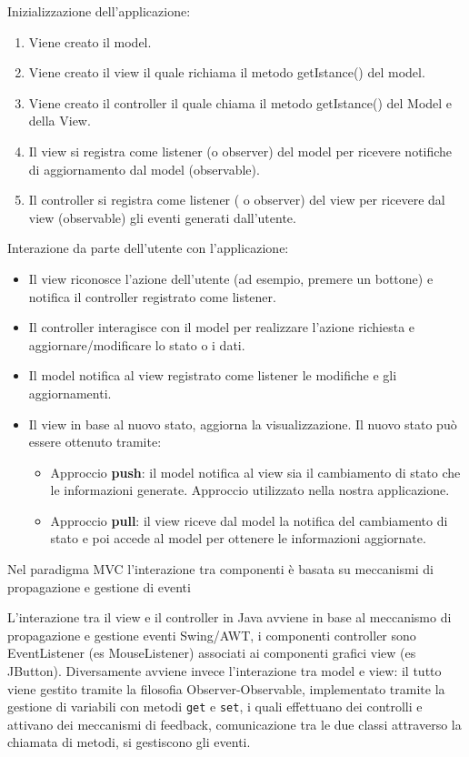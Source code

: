 			Inizializzazione dell'applicazione: 
			\begin{enumerate}
				\item Viene creato il model.
				\item Viene creato il view il quale richiama il metodo getIstance() del model.
				\item Viene creato il controller il quale chiama il metodo getIstance() del Model e della View. 
				\item Il view si registra come listener (o observer) del model per ricevere notifiche di aggiornamento dal model (observable).
				\item Il controller si registra come listener ( o observer) del view per ricevere dal view (observable) gli eventi generati dall'utente.
			\end{enumerate}
			Interazione da parte dell'utente con l'applicazione: 
			\begin{itemize}
				\item Il view riconosce l'azione dell'utente (ad esempio, premere un bottone) e notifica il controller registrato come listener.
				\item Il controller interagisce con il model per realizzare l'azione richiesta e aggiornare/modificare lo stato o i dati.
				\item Il model notifica al view registrato come listener le modifiche e gli aggiornamenti.
				\item Il view in base al nuovo stato, aggiorna la visualizzazione. Il nuovo stato può essere ottenuto tramite:
				\begin{itemize}
					\item Approccio \textbf{push}: il model notifica al view sia il cambiamento di stato che le informazioni generate. Approccio utilizzato nella nostra applicazione.
					\item Approccio \textbf{pull}: il view riceve dal model la notifica del cambiamento di stato e poi accede al model per ottenere le informazioni aggiornate.
				\end{itemize}
			\end{itemize}
			
			Nel paradigma MVC l'interazione tra componenti è basata su meccanismi di propagazione e gestione di eventi 
			
			L'interazione tra il view e il controller in Java avviene in base al meccanismo di propagazione e gestione eventi Swing/AWT, i componenti controller sono EventListener (es MouseListener) associati ai componenti grafici view (es JButton). 
			Diversamente avviene invece l'interazione tra model e view: il tutto viene gestito tramite la filosofia Observer-Observable, implementato  tramite la gestione di variabili con metodi \verb|get| e \verb|set|, i quali effettuano dei controlli e attivano dei meccanismi di feedback, comunicazione tra le due classi attraverso la chiamata di metodi, si gestiscono gli eventi.
			
